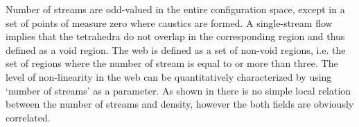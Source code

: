 Number of streams are odd-valued in the entire configuration space, except in a set of points of measure zero where caustics are formed.  
 A single-stream flow implies that the tetrahedra do not overlap in the corresponding region and thus defined as a void region.
 The web is defined as a set of non-void regions, i.e. the set of regions where the number of stream is equal to or more than three.
 The level of non-linearity in the web  can be quantitatively characterized by using `number of streams' as a parameter. As shown in  \citep{Shandarin2012} there is no simple local relation between the number of streams and density, however the both
 fields are obviously correlated.




